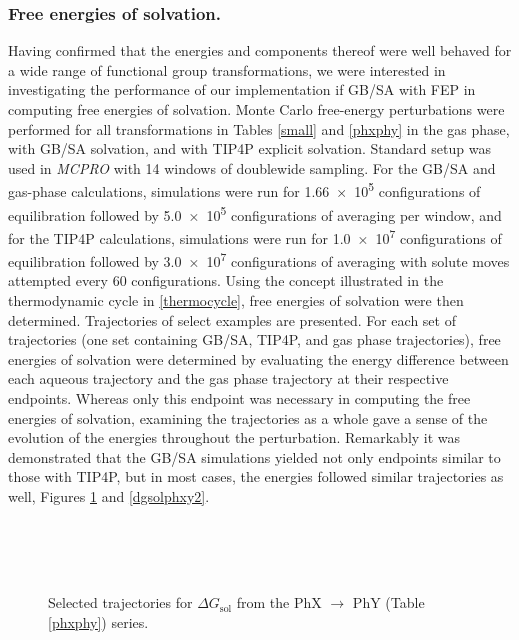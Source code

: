 \documentclass[12pt]{report}
\begin{document}

\subsubsection{Free energies of solvation.}

Having confirmed that the energies and components thereof were well behaved for a wide range of functional group transformations, we were interested in investigating the performance of our implementation if GB/SA with FEP in computing free energies of solvation. Monte Carlo free-energy perturbations were performed for all transformations in Tables \ref{small} and \ref{phxphy} in the gas phase, with GB/SA solvation, and with TIP4P explicit solvation. Standard setup was used in \textit{MCPRO} with 14 windows of doublewide sampling. For the GB/SA and gas-phase calculations, simulations were run for \num{1.66e5} configurations of equilibration followed by \num{5.0e5} configurations of averaging per window, and for the TIP4P calculations, simulations were run for \num{1.0e7} configurations of equilibration followed by \num{3.0e7} configurations of averaging with solute moves attempted every 60 configurations. Using the concept illustrated in the thermodynamic cycle in \cref{thermocycle}, free energies of solvation were then determined. Trajectories of select examples are presented. For each set of trajectories (one set containing GB/SA, TIP4P, and gas phase trajectories), free energies of solvation were determined by evaluating the energy difference between each aqueous trajectory and the gas phase trajectory at their respective endpoints. Whereas only this endpoint was necessary in computing the free energies of solvation, examining the trajectories as a whole gave a sense of the evolution of the energies throughout the perturbation. Remarkably it was demonstrated that the GB/SA simulations yielded not only endpoints similar to those with TIP4P, but in most cases, the energies followed similar trajectories as well, Figures \ref{dgsolphxy1} and \ref{dgsolphxy2}.

\begin{figure}[p]
\centering
\hspace*{-1.3cm}\\
\hspace*{-1.3cm}\\
\hspace*{-1.3cm}\\
\caption{Selected trajectories for $\Delta G_\textrm{sol}$ from the PhX $\longrightarrow$ PhY (Table \ref{phxphy}) series.}
\label{dgsolphxy1}
\end{figure}
\end{document}
